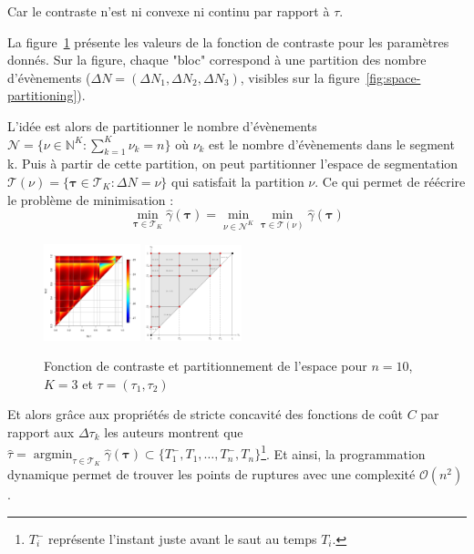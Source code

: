 \documentclass[a4paper,10pt]{article}\usepackage[]{graphicx}\usepackage[]{xcolor}
\DeclareMathOperator*{\argmin}{argmin}
\newcommand{\segspace}{\mathcal{T}_K}
\newcommand{\N}{\mathbb{N}}
\begin{document}
Car le contraste n'est ni convexe ni continu par rapport à $\tau$.

La figure~\ref{fig:contrast-function} présente les valeurs de la fonction de 
contraste pour les paramètres donnés. Sur la figure, chaque "bloc" correspond à
une partition des nombre d'évènements ($\Delta N = (\Delta N_1, \Delta N_2, 
\Delta N_3)$, visibles sur la figure~\ref{fig:space-partitioning}).

L'idée est alors de partitionner le nombre d'évènements  $\mathcal{N} = 
\bigl\{ \nu \in \N^K : \sum_{k=1}^K \nu_k = n \bigr\}$ où $\nu_k$ est le nombre
d'évènements dans le segment k. Puis à partir de cette partition, on peut 
partitionner l'espace de segmentation $\mathcal{T}(\nu) = 
\bigl\{ \bm \tau \in \segspace : \Delta N = \nu \bigr\}$ qui satisfait la 
partition $\nu$. Ce qui permet de réécrire le problème de minimisation :
$$\min_{\bm{\tau}\in\segspace} \widehat \gamma (\bm{\tau}) = \min_{\nu \in 
\mathcal{N}^K} \min_{\bm{\tau}\in\mathcal{T}(\nu)} \widehat \gamma (\bm{\tau})$$

\newpage

\begin{figure}
    \centering
    \caption{Fonction de contraste et partitionnement de l'espace pour $n=10$, $K=3$ et $\tau = (\tau_1,\tau_2)$}
    \label{fig:contrast-function}
    \includegraphics[width=0.25\textwidth]{contrast-function}
    \includegraphics[width=0.25\textwidth]{space-partitioning}
\end{figure}

Et alors grâce aux propriétés de stricte concavité des fonctions de coût $C$ par
rapport aux $\Delta \tau_k$ les auteurs montrent que $\hat{\tau} = 
\argmin_{\tau\in\segspace} \hat{\gamma}(\bm{\tau}) \subset \bigl\{ T^-_1, T_1, 
\dots, T^-_n, T_n \bigr\}$\footnote{$T_i^-$ représente l'instant juste avant le saut
au temps $T_i$.}. Et ainsi, la programmation dynamique permet de trouver
les points de ruptures avec une complexité $\mathcal{O}(n^2)$.
\end{document}
